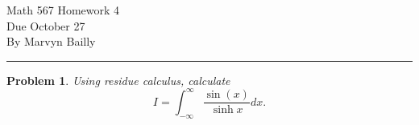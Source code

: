 \documentclass[12pt]{report}
\newtheorem{problem}{Problem}
\begin{document}
\large

\begin{center}
 Math 567 Homework 4\\
 Due October 27\\
 By Marvyn Bailly\\
\end{center}

\normalsize

\hrule



\begin{problem}
    Using residue calculus, calculate
    \[ I = \int_{-\infty}^{\infty} \frac{\sin(x)}{\sinh{x}} dx.\]
\end{problem}
\end{document}
